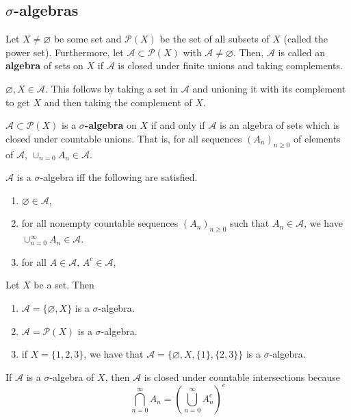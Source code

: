 \documentclass[11pt,leqno,oneside]{amsbook}
\numberwithin{thm}{section}
\renewcommand{\P}{\mathcal{P}} %
\renewcommand{\A}{\mathcal{A}} %
\newcommand{\s}{$\sigma$-} %
\renewcommand{\de}{\textbf} %
\begin{document}
\subsection{\s algebras}
\begin{defn}
Let $X \neq \varnothing$ be some set and $\P(X)$ be the set of all
subsets of $X$ (called the power set). Furthermore, let $\A \subset
\P(X)$ with $\A \neq \varnothing$. Then, $\A$ is called an \de{algebra} of
sets on $X$ if $\A$ is closed under finite unions and taking
complements.
\end{defn}
\begin{lem}
  $\varnothing, X \in \A$. This follows by taking a set in $\A$ and
  unioning it with its complement to get $X$ and then taking the
  complement of $X$.
\end{lem}
\begin{defn}
  $\A \subset \P(X)$ is a \de{\s algebra} on $X$ if and only if
  $\A$ is an algebra of sets which is closed under countable
  unions. That is, for all sequences $(A_n)_{n \geq 0}$ of elements of $\A$,
  $\cup_{n=0} A_n \in \A$.
\end{defn}
\begin{thm}
  $\A$ is a \s algebra iff the following are satisfied.
  \begin{enumerate}
    \item $\varnothing \in \A$,
    \item for all nonempty countable sequences $(A_n)_{n \geq 0}$ such that $A_n \in \A$, we have
      $\cup_{n=0}^\infty A_n \in \A$.
    \item for all $A \in \A$, $A^c \in \A$,
  \end{enumerate}
\end{thm}
\begin{example}
  Let $X$ be a set. Then
  \begin{enumerate}
  \item $\A = \{\varnothing,X\}$ is a \s algebra.
  \item $\A = \P(X)$ is a \s algebra.
  \item if $X = \{1,2,3\}$, we have that $\A =
    \{\varnothing,X,\{1\},\{2,3\}\}$ is a \s algebra.
  \end{enumerate}
\end{example}
\begin{prop}
  If $\A$ is a \s algebra of $X$, then $\A$ is closed under
  countable intersections because \[
    \bigcap_{n=0}^\infty A_n = \left( \bigcup_{n=0}^\infty A_n^c \right)^c
  \]
\end{prop}
\end{document}
